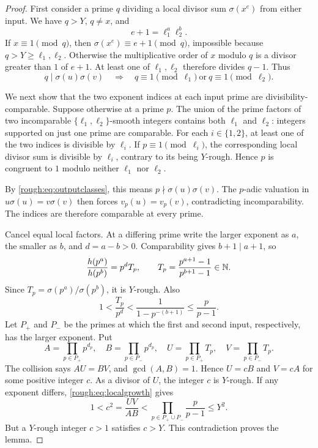\begin{proof}
First consider a prime $q$ dividing a local divisor sum $\sigma(x^e)$ from either input. We have $q>Y$, $q\ne x$, and
\[
 e+1=\ell_1^a\ell_2^b.
\]
If $x\equiv1\pmod q$, then $\sigma(x^e)\equiv e+1\pmod q$, impossible because $q>Y\ge\ell_1,\ell_2$. Otherwise the multiplicative order of $x$ modulo $q$ is a divisor greater than $1$ of $e+1$. At least one of $\ell_1,\ell_2$ therefore divides $q-1$. Thus
\begin{equation}\label{rough:eq:outputclasses}
 q\mid\sigma(u)\sigma(v)
 \quad\Longrightarrow\quad
 q\equiv1\pmod{\ell_1}\ \text{or}\ q\equiv1\pmod{\ell_2}.
\end{equation}

We next show that the two exponent indices at each input prime are divisibility-comparable. Suppose otherwise at a prime $p$. The union of the prime factors of two incomparable $\{\ell_1,\ell_2\}$-smooth integers contains both $\ell_1$ and $\ell_2$: integers supported on just one prime are comparable. For each $i\in\{1,2\}$, at least one of the two indices is divisible by $\ell_i$. If $p\equiv1\pmod{\ell_i}$, the corresponding local divisor sum is divisible by $\ell_i$, contrary to its being $Y$-rough. Hence $p$ is congruent to $1$ modulo neither $\ell_1$ nor $\ell_2$.

By \eqref{rough:eq:outputclasses}, this means $p\nmid\sigma(u)\sigma(v)$. The $p$-adic valuation in $u\sigma(u)=v\sigma(v)$ then forces $v_p(u)=v_p(v)$, contradicting incomparability. The indices are therefore comparable at every prime.

Cancel equal local factors. At a differing prime write the larger exponent as $a$, the smaller as $b$, and $d=a-b>0$. Comparability gives $b+1\mid a+1$, so
\[
 \frac{h(p^a)}{h(p^b)}=p^d T_p,\qquad
 T_p=\frac{p^{a+1}-1}{p^{b+1}-1}\in\mathbb N.
\]
Since $T_p=\sigma(p^a)/\sigma(p^b)$, it is $Y$-rough. Also
\begin{equation}\label{rough:eq:localgrowth}
 1<\frac{T_p}{p^d}<\frac{1}{1-p^{-(b+1)}}\le\frac{p}{p-1}.
\end{equation}
Let $P_+$ and $P_-$ be the primes at which the first and second input, respectively, has the larger exponent. Put
\[
 A=\prod_{p\in P_+}p^{d_p},\quad
 B=\prod_{p\in P_-}p^{d_p},\quad
 U=\prod_{p\in P_+}T_p,\quad
 V=\prod_{p\in P_-}T_p.
\]
The collision says $AU=BV$, and $\gcd(A,B)=1$. Hence $U=cB$ and $V=cA$ for some positive integer $c$. As a divisor of $U$, the integer $c$ is $Y$-rough. If any exponent differs, \eqref{rough:eq:localgrowth} gives
\[
 1<c^2=\frac{UV}{AB}
 <\prod_{p\in P_+\cup P_-}\frac{p}{p-1}
 \le Y^2.
\]
But a $Y$-rough integer $c>1$ satisfies $c>Y$. This contradiction proves the lemma.
\end{proof}

